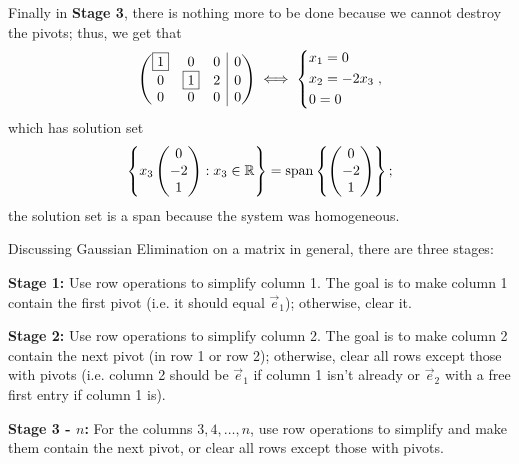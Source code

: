 \documentclass[main.tex]{subfiles}
\begin{document}
Finally in \textbf{Stage 3}, there is nothing more to be done because we cannot destroy the pivots; thus, we get that
\[\left(\begin{array}{@{}c c c | c@{}}
    \boxed{1} & 0 & 0 & 0 \\
    0 & \boxed{1} & 2 & 0 \\
    0 & 0 & 0 & 0
\end{array}
\right) \iff
\left\{\begin{aligned}
    &x_1 = 0 \\
    &x_2 = -2x_3 \\
    &0 = 0
\end{aligned}\right. ,\]
which has solution set
\[\left\{x_3\begin{pmatrix}0 \\ -2 \\ 1\end{pmatrix} : x_3\in \mathbb R\right\} = \operatorname{span}\left\{\begin{pmatrix}0 \\ -2 \\ 1\end{pmatrix}\right\};\]
the solution set is a span because the system was homogeneous.

Discussing Gaussian Elimination on a matrix in general, there are three stages:

\textbf{Stage 1:} Use row operations to simplify column 1. The goal is to make column 1 contain the first pivot (i.e. it should equal $\vec{e}_1$); otherwise, clear it.

\textbf{Stage 2:} Use row operations to simplify column 2. The goal is to make column 2 contain the next pivot (in row 1 or row 2); otherwise, clear all rows except those with pivots (i.e. column 2 should be $\vec{e}_1$ if column 1 isn't already or $\vec{e}_2$ with a free first entry if column 1 is).

\textbf{Stage 3 - $n$:} For the columns $3, 4, \ldots , n$, use row operations to simplify and make them contain the next pivot, or clear all rows except those with pivots. 
\end{document}
